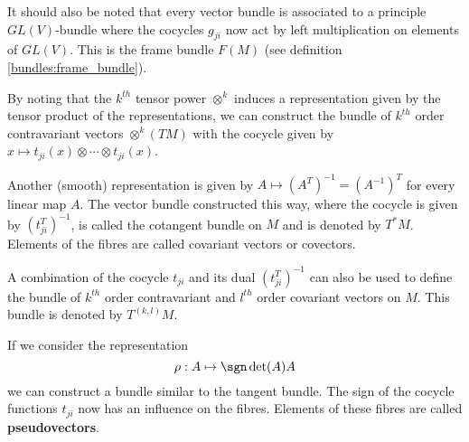 	\begin{remark}
		\label{manifolds:vector_principal_correspondence}
		It should also be noted that every vector bundle is associated to a principle $GL(V)$-bundle where the cocycles $g_{ji}$ now act by left multiplication on elements of $GL(V)$. This is the frame bundle $F(M)$ (see definition \ref{bundles:frame_bundle}).
	\end{remark}

	\begin{example}
		By noting that the $k^{th}$ tensor power $\otimes^k$ induces a representation given by the tensor product of the representations, we can construct the bundle of $k^{th}$ order contravariant vectors $\otimes^k(TM)$ with the cocycle given by $x\mapsto t_{ji}(x)\otimes\cdots\otimes t_{ji}(x)$.
	\end{example}
	\begin{example}\label{manifolds:cotangent_bundle}
		Another (smooth) representation is given by $A\mapsto (A^T)^{-1}=(A^{-1})^T$ for every linear map $A$. The vector bundle constructed this way, where the cocycle is given by $(t_{ji}^T)^{-1}$, is called the cotangent bundle on $M$ and is denoted by $T^*M$. Elements of the fibres are called covariant vectors or covectors.
	\end{example}
	\begin{notation}
		A combination of the cocycle $t_{ji}$ and its dual $(t_{ji}^T)^{-1}$ can also be used to define the bundle of $k^{th}$ order contravariant and $l^{th}$ order covariant vectors on $M$. This bundle is denoted by $T^{(k, l)}M$.
	\end{notation}
	
	\begin{example}[Pseudovectors]
		If we consider the representation
		\begin{equation}
			\rho:A\mapsto \sgn\det(A)A
		\end{equation}
		we can construct a bundle similar to the tangent bundle. The sign of the cocycle functions $t_{ji}$ now has an influence on the fibres. Elements of these fibres are called \textbf{pseudovectors}.
	\end{example}
	
